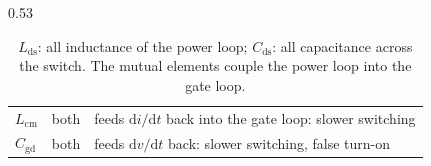 \begin{frame}
\begin{columns}[T]
\begin{column}{0.53\textwidth}
\begin{table}
\begin{tabular}{|l|l|>{\raggedright\arraybackslash}p{4.5cm}|}
					$L_\mathrm{cm}$    & both            & feeds $\mathrm{d}i/\mathrm{d}t$ back into the gate loop: slower switching \\
					$C_\mathrm{gd}$    & both            & feeds $\mathrm{d}v/\mathrm{d}t$ back: slower switching, false turn-on \\
					\hline
				\end{tabular}
				\caption{$L_\mathrm{ds}$: all inductance of the power loop; $C_\mathrm{ds}$: all capacitance across the switch. The mutual elements couple the power loop into the gate loop.}
			\end{table}
		\end{column}
	\end{columns}
\end{frame}

